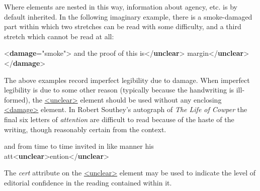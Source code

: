Where elements are nested in this way, information about agency, etc. is by default inherited. In the following imaginary example, there is a smoke-damaged part within which two stretches can be read with some difficulty, and a third stretch which cannot be read at all: \par\bgroup{}\exampleFont \begin{shaded}\noindent\mbox{}{<\textbf{damage}\hspace*{1em}{agent}="{smoke}">}\mbox{}\newline 
{}and the proof of this is{</\textbf{unclear}>}\mbox{}\newline 
{}\mbox{}\newline 
{}margin{</\textbf{unclear}>}\mbox{}\newline 
{</\textbf{damage}>}\end{shaded}\egroup\par \par
The above examples record imperfect legibility due to damage. When imperfect legibility is due to some other reason (typically because the handwriting is ill-formed), the \hyperref[TEI.unclear]{<unclear>} element should be used without any enclosing \hyperref[TEI.damage]{<damage>} element. In Robert Southey's autograph of \textit{The Life of Cowper} the final six letters of \textit{attention} are difficult to read because of the haste of the writing, though reasonably certain from the context. \par\bgroup{}\exampleFont \begin{shaded}\noindent\mbox{}and\mbox{}\newline 
 from time to time invited in like manner his att{<\textbf{unclear}>}ention{</\textbf{unclear}>}\end{shaded}\egroup\par \noindent  The {\itshape cert} attribute on the \hyperref[TEI.unclear]{<unclear>} element may be used to indicate the level of editorial confidence in the reading contained within it.
